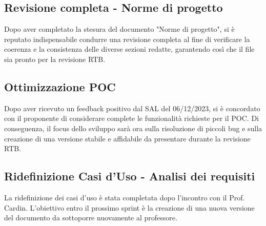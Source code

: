 \documentclass{article}
\begin{document}
    \subsection{Revisione completa - Norme di progetto}
    Dopo aver completato la stesura del documento "Norme di progetto", si è reputato indispensabile condurre una revisione completa al fine di verificare la coerenza e la consistenza delle diverse sezioni redatte, garantendo così che il file sia pronto per la revisione RTB.
    \subsection{Ottimizzazione POC}
    Dopo aver ricevuto un feedback positivo dal SAL del 06/12/2023, si è concordato con il proponente di considerare complete le funzionalità richieste per il POC. Di conseguenza, il focus dello sviluppo sarà ora sulla risoluzione di piccoli bug e sulla creazione di una versione stabile e affidabile da presentare durante la revisione RTB.
    \subsection{Ridefinizione Casi d'Uso - Analisi dei requisiti}
    La ridefinizione dei casi d'uso è stata completata dopo l'incontro con il Prof. Cardin. L'obiettivo entro il prossimo sprint è la creazione di una nuova versione del documento da sottoporre nuovamente al professore.
\end{document}
